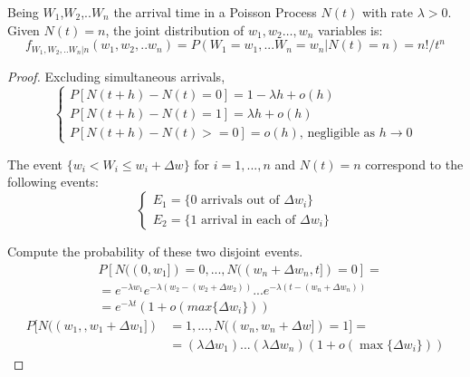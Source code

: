 \begin{theorem}
	Being $W_{1}$,$W_{2}$,..$W_{n}$ the arrival time in a Poisson Process $N(t)$ with rate ${\lambda}>0$. Given $N(t)=n$, the joint distribution of $w_{1},w_{2}\dots,w_{n}$ variables is:
	\begin{equation}
	f_{W_1,W_2,..W_n|n} (w_1,w_2,..w_n) = P (W_1=w_1,...W_n=w_n|N(t)=n) = n!/t^n
	\end{equation}
	\begin{proof}
		Excluding simultaneous arrivals,
		\begin{equation*}
			\begin{cases}
				P[N(t+h)-N(t)=0]= 1 - \lambda h+ o(h) \\
				P[N(t+h)-N(t)=1]= \lambda h+ o(h) \\
				P[N(t+h)-N(t)>=0]= o(h) \text{, negligible as } h\rightarrow 0
			\end{cases}
		\end{equation*}

		The event $ \{w_i<W_i \leq w_i+\Delta w \}$ for $i=1,...,n$ and $N(t)=n$ correspond to the following events:
		\begin{equation*}
			\begin{cases}
				E_1=\{\text{0 arrivals out of } \Delta w_i \} \\
				E_2=\{\text{1 arrival in each of } \Delta w_i \}
			\end{cases}
		\end{equation*}

		Compute the probability of these two disjoint events.
		\begin{equation}
			\begin{split}
				& P[N((0,w_1])=0,...,N((w_n+\Delta w_n,t])=0] = \\
				& = e^{-\lambda w_1} e^{-\lambda (w_2-(w_2+\Delta w_2))} ... e^{-\lambda (t-(w_n+\Delta w_n))} \\
				& =e^{-\lambda t} (1+o(max\{\Delta w_i\}))
			\end{split}
		\end{equation}
		\begin{equation}
			\begin{split}
				P[N((w_1,,w_1+\Delta w_1]) &=1,...,N((w_n,w_n+\Delta w])=1] =\\
				& = (\lambda \Delta w_1) ... (\lambda \Delta w_n) (1+o(\max\{\Delta w_i\}))
			\end{split}
		\end{equation}


\end{proof}
\end{theorem}
